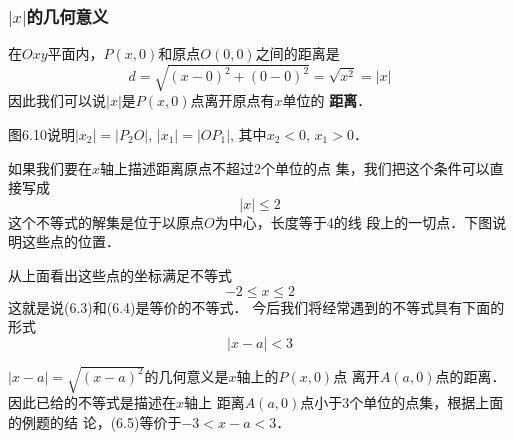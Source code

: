 \subsubsection{$|x|$的几何意义}
在$Oxy$平面内，$P(x,0)$和原点$O(0,0)$之间的距离是
\[d=\sqrt{(x-0)^2+(0-0)^2}=\sqrt{x^2}=|x|\]
因此我们可以说$|x|$是$P(x,0)$点离开原点有$x$单位的
\textbf{距离}．

图6.10说明$|x_2|=|P_2O|$, $|x_1|=|OP_1|$, 其中$x_2<0$,
$x_1>0$．
\begin{figure}[htp]
    \centering
    \caption{}
\end{figure}

如果我们要在$x$轴上描述距离原点不超过2个单位的点
集，我们把这个条件可以直接写成
\begin{equation}
    |x|\le 2
\end{equation}
这个不等式的解集是位于以原点$O$为中心，长度等于4的线
段上的一切点．下图说明这些点的位置．
\begin{figure}[htp]
    \centering
{}
    \caption{}
\end{figure}

从上面看出这些点的坐标满足不等式
\begin{equation}
    -2\le x\le 2
\end{equation}
这就是说(6.3)和(6.4)是等价的不等式．
今后我们将经常遇到的不等式具有下面的形式
\begin{equation}
    |x-a|<3
\end{equation}

$|x-a|=\sqrt{(x-a)^2}$的几何意义是$x$轴上的$P(x,0)$点
离开$A(a,0)$点的距离．因此已给的不等式是描述在$x$轴上
距离$A(a,0)$点小于3个单位的点集，根据上面的例题的结
论，(6.5)等价于$-3<x-a<3$．


